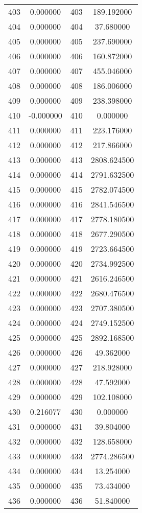 \documentclass[12pt]{article}
\begin{document}
\begin{longtable}{@{}cccc@{}}
403 & 0.000000 & 403 & 189.192000 \\
404 & 0.000000 & 404 & 37.680000 \\
405 & 0.000000 & 405 & 237.690000 \\
406 & 0.000000 & 406 & 160.872000 \\
407 & 0.000000 & 407 & 455.046000 \\
408 & 0.000000 & 408 & 186.006000 \\
409 & 0.000000 & 409 & 238.398000 \\
410 & -0.000000 & 410 & 0.000000 \\
411 & 0.000000 & 411 & 223.176000 \\
412 & 0.000000 & 412 & 217.866000 \\
413 & 0.000000 & 413 & 2808.624500 \\
414 & 0.000000 & 414 & 2791.632500 \\
415 & 0.000000 & 415 & 2782.074500 \\
416 & 0.000000 & 416 & 2841.546500 \\
417 & 0.000000 & 417 & 2778.180500 \\
418 & 0.000000 & 418 & 2677.290500 \\
419 & 0.000000 & 419 & 2723.664500 \\
420 & 0.000000 & 420 & 2734.992500 \\
421 & 0.000000 & 421 & 2616.246500 \\
422 & 0.000000 & 422 & 2680.476500 \\
423 & 0.000000 & 423 & 2707.380500 \\
424 & 0.000000 & 424 & 2749.152500 \\
425 & 0.000000 & 425 & 2892.168500 \\
426 & 0.000000 & 426 & 49.362000 \\
427 & 0.000000 & 427 & 218.928000 \\
428 & 0.000000 & 428 & 47.592000 \\
429 & 0.000000 & 429 & 102.108000 \\
430 & 0.216077 & 430 & 0.000000 \\
431 & 0.000000 & 431 & 39.804000 \\
432 & 0.000000 & 432 & 128.658000 \\
433 & 0.000000 & 433 & 2774.286500 \\
434 & 0.000000 & 434 & 13.254000 \\
435 & 0.000000 & 435 & 73.434000 \\
436 & 0.000000 & 436 & 51.840000 \\

\end{longtable}
\end{document}
